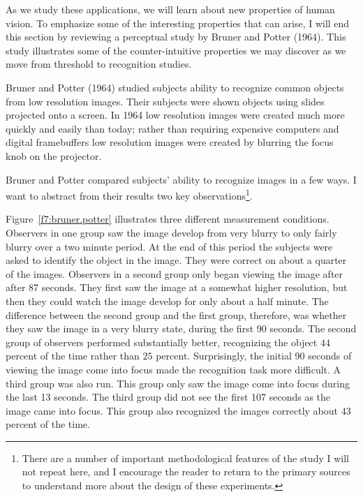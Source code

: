 As we study these applications, we will learn about new properties of
human vision.  To emphasize some of the interesting properties that
can arise, I will end this section by reviewing a perceptual study by
Bruner and Potter (1964).  This study illustrates some of the
counter-intuitive properties we may discover as we move from threshold
to recognition studies.

Bruner and Potter (1964) studied subjects ability to recognize common
objects from low resolution images.  Their subjects were shown objects
using slides projected onto a screen.  In 1964 low resolution images
were created much more quickly and easily than today; rather than
requiring expensive computers and digital framebuffers low resolution
images were created by blurring the focus knob on the projector.

Bruner and Potter compared subjects' ability to recognize images in a
few ways.  I want to abstract from their results two key
observations\footnote{ There are a number of important methodological
features of the study I will not repeat here, and I encourage the
reader to return to the primary sources to understand more about the
design of these experiments.  }.

Figure~\ref{f7:bruner.potter} illustrates three different measurement
conditions.  Observers in one group saw the image develop from very
blurry to only fairly blurry over a two minute period.  At the end of
this period the subjects were asked to identify the object in the
image.  They were correct on about a quarter of the images.  Observers
in a second group only began viewing the image after after 87 seconds.
They first saw the image at a somewhat higher resolution, but then
they could watch the image develop for only about a half minute.  The
difference between the second group and the first group, therefore,
was whether they saw the image in a very blurry state, during the
first 90 seconds.  The second group of observers performed
substantially better, recognizing the object $44$ percent of the time
rather than $25$ percent.  Surprisingly, the initial 90 seconds of
viewing the image come into focus made the recognition task more
difficult.  A third group was also run.  This group only saw the image
come into focus during the last 13 seconds.  The third group did not
see the first 107 seconds as the image came into focus.  This group
also recognized the images correctly about $43$ percent of the time.

